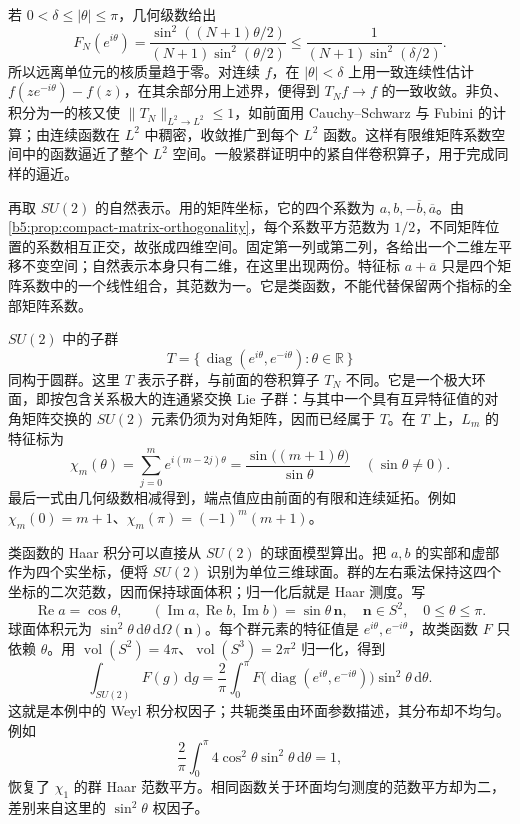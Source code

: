 \ProseParagraphBreak
若 \(0<\delta\le|\theta|\le\pi\)，几何级数给出
\[
	F_N(e^{i\theta}) =\frac{\sin^2((N+1)\theta/2)}{(N+1)\sin^2(\theta/2)} \le\frac1{(N+1)\sin^2(\delta/2)}.
\]
所以远离单位元的核质量趋于零。对连续 \(f\)，在 \(|\theta|<\delta\) 上用一致连续性估计 \(f(ze^{-i\theta})-f(z)\)，在其余部分用上述界，便得到 \(T_Nf\to f\) 的一致收敛。非负、积分为一的核又使 \(\|T_N\|_{L^2\to L^2}\le1\)，如前面用 Cauchy--Schwarz 与 Fubini 的计算；由连续函数在 \(L^2\) 中稠密，收敛推广到每个 \(L^2\) 函数。这样有限维矩阵系数空间中的函数逼近了整个 \(L^2\) 空间。一般紧群证明中的紧自伴卷积算子，用于完成同样的逼近。

\ProseParagraphBreak
再取 \(SU(2)\) 的自然表示。用的矩阵坐标，它的四个系数为 \(a,b,-\overline b,\overline a\)。由\cref{b5:prop:compact-matrix-orthogonality}，每个系数平方范数为 \(1/2\)，不同矩阵位置的系数相互正交，故张成四维空间。固定第一列或第二列，各给出一个二维左平移不变空间；自然表示本身只有二维，在这里出现两份。特征标 \(a+\overline a\) 只是四个矩阵系数中的一个线性组合，其范数为一。它是类函数，不能代替保留两个指标的全部矩阵系数。

\ProseParagraphBreak
\(SU(2)\) 中的子群
\[
	T=\{\,\operatorname{diag}(e^{i\theta},e^{-i\theta}):\theta\in\mathbb R\,\}
\]
同构于圆群。这里 \(T\) 表示子群，与前面的卷积算子 \(T_N\) 不同。它是一个极大环面，即按包含关系极大的连通紧交换 Lie 子群：与其中一个具有互异特征值的对角矩阵交换的 \(SU(2)\) 元素仍须为对角矩阵，因而已经属于 \(T\)。在 \(T\) 上，\(L_m\) 的特征标为
\[
	\chi_m(\theta)=\sum_{j=0}^m e^{i(m-2j)\theta} =\frac{\sin\bigl((m+1)\theta\bigr)}{\sin\theta} \quad(\sin\theta\ne0).
\]
最后一式由几何级数相减得到，端点值应由前面的有限和连续延拓。例如 \(\chi_m(0)=m+1\)、\(\chi_m(\pi)=(-1)^m(m+1)\)。

\ProseParagraphBreak
类函数的 Haar 积分可以直接从 \(SU(2)\) 的球面模型算出。把 \(a,b\) 的实部和虚部作为四个实坐标，便将 \(SU(2)\) 识别为单位三维球面。群的左右乘法保持这四个坐标的二次范数，因而保持球面体积；归一化后就是 Haar 测度。写
\[
	\operatorname{Re}a=\cos\theta,\qquad (\operatorname{Im}a,\operatorname{Re}b,\operatorname{Im}b)=\sin\theta\,\mathbf n, \quad \mathbf n\in S^2,\quad0\le\theta\le\pi.
\]
球面体积元为 \(\sin^2\theta\,\mathrm{d}\theta\,\mathrm{d}\Omega(\mathbf n)\)。每个群元素的特征值是 \(e^{i\theta},e^{-i\theta}\)，故类函数 \(F\) 只依赖 \(\theta\)。用 \(\operatorname{vol}(S^2)=4\pi\)、\(\operatorname{vol}(S^3)=2\pi^2\) 归一化，得到
\[
	\int_{SU(2)}F(g)\,\mathrm{d}g =\frac2\pi\int_0^\pi F\bigl(\operatorname{diag}(e^{i\theta},e^{-i\theta})\bigr) \sin^2\theta\,\mathrm{d}\theta.
\]
这就是本例中的 Weyl 积分权因子；共轭类虽由环面参数描述，其分布却不均匀。例如
\[
	\frac2\pi\int_0^\pi4\cos^2\theta\sin^2\theta\,\mathrm{d}\theta=1,
\]
恢复了 \(\chi_1\) 的群 Haar 范数平方。相同函数关于环面均匀测度的范数平方却为二，差别来自这里的 \(\sin^2\theta\) 权因子。
